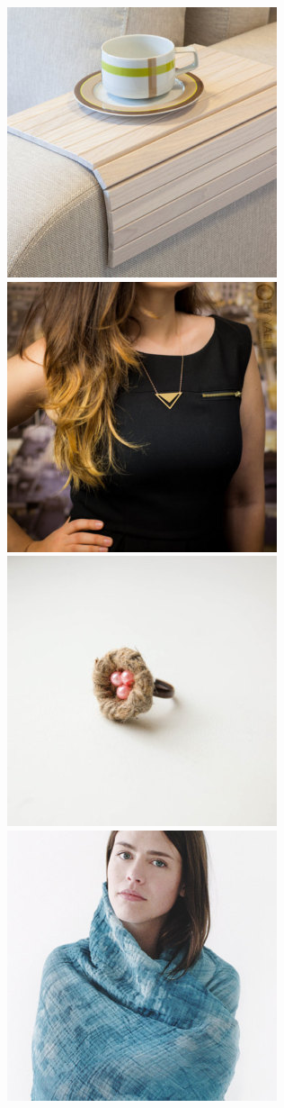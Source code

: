 \documentclass[conference,a4paper]{IEEEtran}
\begin{document}
\begin{figure}
    \includegraphics[scale=0.15]{./figures/sample17.jpg}
    \includegraphics[scale=0.15]{./figures/sample18.jpg}
     \includegraphics[scale=0.15]{./figures/sample19.jpg}
    \includegraphics[scale=0.15]{./figures/sample20.jpg}

\end{figure}
\end{document}
